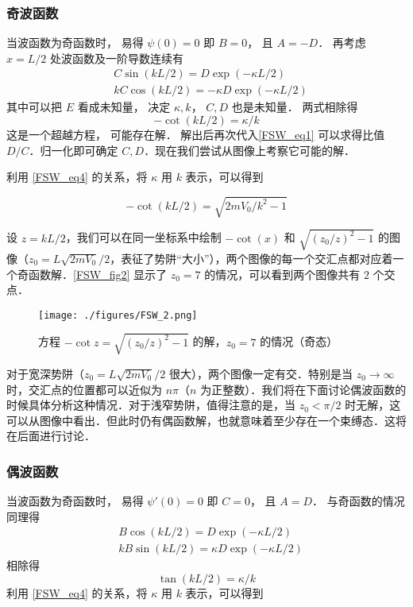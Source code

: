 \subsubsection{奇波函数}
当波函数为奇函数时， 易得 $\psi(0) = 0$ 即 $B = 0$， 且 $A = -D$． 再考虑 $x = L/2$ 处波函数及一阶导数连续有
\begin{equation}\label{FSW_eq1}
\begin{aligned}
&C\sin(k L/2) = D \exp(-\kappa L/2)\\
&k C \cos(k L/2) = -\kappa D \exp(-\kappa L/2)
\end{aligned}
\end{equation}
其中可以把 $E$ 看成未知量， 决定 $\kappa, k$， $C,D$ 也是未知量． 两式相除得
\begin{equation}\label{FSW_eq2}
-\cot(k L/2) = \kappa /k
\end{equation}
这是一个超越方程， 可能存在解． 解出后再次代入\autoref{FSW_eq1} 可以求得比值 $D/C$．归一化即可确定 $C, D$．现在我们尝试从图像上考察它可能的解．

利用 \autoref{FSW_eq4} 的关系，将 $\kappa$ 用 $k$ 表示，可以得到

\begin{equation}\label{FSW_eq5}
-\cot(k L/2)=\sqrt{2mV_0/k^2-1}
\end{equation}

设 $z=k L/2$，我们可以在同一坐标系中绘制 $-\cot(x)$ 和 $\sqrt{(z_0/z)^2-1}$ 的图像（$z_0=L\sqrt{2mV_0}/2$，表征了势阱“大小”），两个图像的每一个交汇点都对应着一个奇函数解．\autoref{FSW_fig2} 显示了 $z_0=7$ 的情况，可以看到两个图像共有 $2$ 个交点．

\begin{figure}[ht]
\centering
\texttt{[image: ./figures/FSW\_2.png]}
\caption{方程 $-\cot z=\sqrt{(z_0/z)^2-1}$ 的解，$z_0=7$ 的情况（奇态）} \label{FSW_fig2}
\end{figure}

对于宽深势阱（$z_0=L\sqrt{2mV_0}/2$ 很大），两个图像一定有交．特别是当 $z_0\rightarrow\infty$ 时，交汇点的位置都可以近似为 $n\pi$（$n$ 为正整数）．我们将在下面讨论偶波函数的时候具体分析这种情况．对于浅窄势阱，值得注意的是，当 $z_0<\pi/2$ 时无解，这可以从图像中看出．但此时仍有偶函数解，也就意味着至少存在一个束缚态．这将在后面进行讨论．

\subsubsection{偶波函数}
当波函数为奇函数时， 易得 $\psi'(0) = 0$ 即 $C = 0$， 且 $A = D$． 与奇函数的情况同理得
\begin{equation}
\begin{aligned}
&B\cos(k L/2) = D \exp(-\kappa L/2)\\
&k B \sin(k L/2) = \kappa D \exp(-\kappa L/2)
\end{aligned}
\end{equation}
相除得
\begin{equation}\label{FSW_eq3}
\tan(k L/2) = \kappa /k
\end{equation}
利用 \autoref{FSW_eq4} 的关系，将 $\kappa $ 用 $k$ 表示，可以得到

